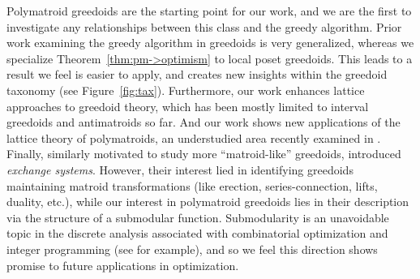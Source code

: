 \documentclass[11pt]{article}
\begin{document}
Polymatroid greedoids \cite{korte1985polymatroid} are the starting point for our work, and we are the first to investigate any relationships between this class and the greedy algorithm.
Prior work examining the greedy algorithm in greedoids is very generalized, whereas we specialize Theorem~\ref{thm:pm->optimism} to local poset greedoids.
This leads to a result we feel is easier to apply, and creates new insights within the greedoid taxonomy (see Figure~\ref{fig:tax}).
Furthermore, our work enhances lattice approaches to greedoid theory, which has been mostly limited to interval greedoids \cite{crapo1984selectors,korte2012greedoids,faigle1980geometries} and antimatroids \cite{edelman1985theory} so far.
And our work shows new applications of the lattice theory of polymatroids, an understudied area recently examined in \cite{gustafson2023polymatroids}.
Finally, similarly motivated to study more ``matroid-like'' greedoids, \cite{brylawski1988exchange} introduced \emph{exchange systems}.
However, their interest lied in identifying greedoids maintaining matroid transformations (like erection, series-connection, lifts, duality, etc.), while our interest in polymatroid greedoids lies in their description via the structure of a submodular function.
Submodularity is an unavoidable topic in the discrete analysis associated with combinatorial optimization and integer programming (see \cite{fujishige2005submodular,murota1998discrete} for example), and so we feel this direction shows promise to future applications in optimization.
\end{document}

